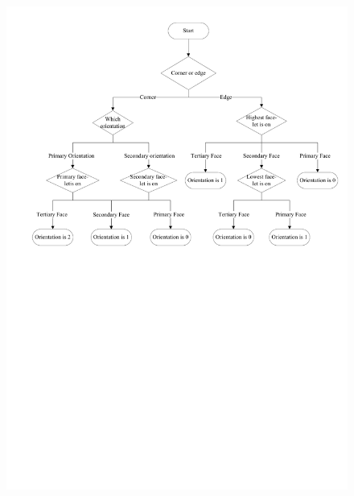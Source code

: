 \begin{figure}[hbp]
	\centering
		\includegraphics[width = \textwidth, trim = 10mm 150mm 0mm 10mm, clip]{input/pics/orientationFlow}
	\caption{}
	\label{fig:orientationFlow}
\end{figure}

